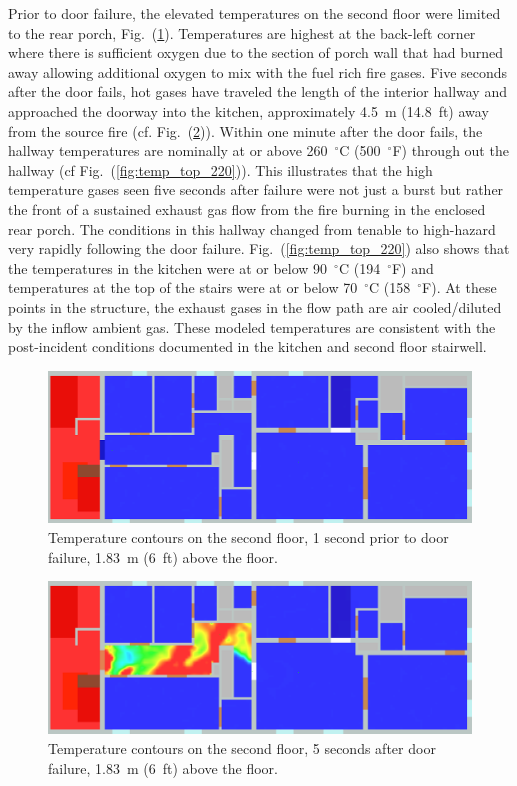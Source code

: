 \documentclass[11pt,oneside]{book}
\begin{document}
Prior to door failure, the elevated temperatures on the second floor were limited to the rear porch, Fig.~(\ref{fig:temp_top_159}). Temperatures are highest at the back-left corner where there is sufficient oxygen due to the section of porch wall that had burned away allowing additional oxygen to mix with the fuel rich fire gases. Five seconds after the door fails, hot gases have traveled the length of the interior hallway and approached the doorway into the kitchen, approximately 4.5~m (14.8~ft) away from the source fire (cf. Fig.~(\ref{fig:temp_top_165})). Within one minute after the door fails, the hallway temperatures are nominally at or above 260~$^{\circ}$C (500~$^{\circ}$F) through out the hallway (cf Fig.~(\ref{fig:temp_top_220})). This illustrates that the high temperature gases seen five seconds after failure were not just a burst but rather the front of a sustained exhaust gas flow from the fire burning in the enclosed rear porch. The conditions in this hallway changed from tenable to high-hazard very rapidly following the door failure. Fig.~(\ref{fig:temp_top_220}) also shows that the temperatures in the kitchen were at or below 90~$^{\circ}$C (194~$^{\circ}$F) and temperatures at the top of the stairs were at or below 70~$^{\circ}$C (158~$^{\circ}$F). At these points in the structure, the exhaust gases in the flow path are air cooled/diluted by the inflow ambient gas. These modeled temperatures are consistent with the post-incident conditions documented in the kitchen and second floor stairwell.
\begin{figure}[h!]
\centering
\includegraphics[width=.7\textwidth]{../Figures/west_50th_baseline_top_159_6ft}
 

\caption{Temperature contours on the second floor, 1 second prior to door failure, 1.83~m (6~ft) above the floor.}
\label{fig:temp_top_159}
\end{figure}

\begin{figure}[h!]
\centering
\includegraphics[width=.7\textwidth]{../Figures/west_50th_baseline_top_165_6ft}
 

\caption{Temperature contours on the second floor, 5 seconds after door failure, 1.83~m (6~ft) above the floor.}
\label{fig:temp_top_165}
\end{figure}
\end{document}
